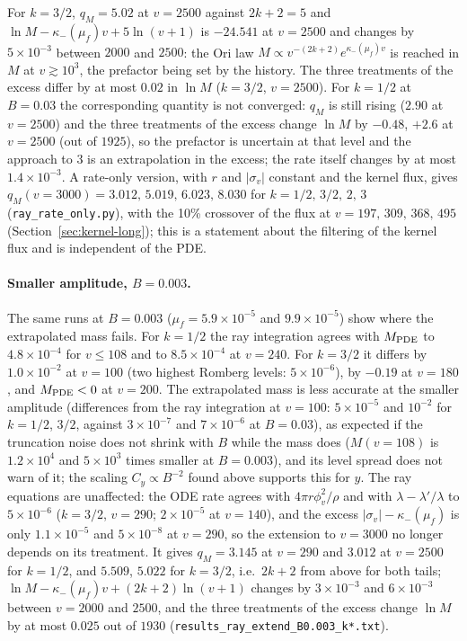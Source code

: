 \documentclass[11pt]{article}
\begin{document}
For $k=3/2$, $q_M=5.02$ at $v=2500$ against $2k+2=5$ and $\ln M-\kappa_-(\mu_f)v+5\ln(v+1)$ is $-24.541$ at $v=2500$ and changes by $5\times10^{-3}$ between $2000$ and $2500$: the Ori law $M\propto v^{-(2k+2)}e^{\kappa_-(\mu_f)v}$ is reached in $M$ at $v\gtrsim10^3$, the prefactor being set by the history. The three treatments of the excess differ by at most $0.02$ in $\ln M$ ($k=3/2$, $v=2500$). For $k=1/2$ at $B=0.03$ the corresponding quantity is not converged: $q_M$ is still rising ($2.90$ at $v=2500$) and the three treatments of the excess change $\ln M$ by $-0.48$, $+2.6$ at $v=2500$ (out of $1925$), so the prefactor is uncertain at that level and the approach to $3$ is an extrapolation in the excess; the rate itself changes by at most $1.4\times10^{-3}$. A rate-only version, with $r$ and $|\sigma_v|$ constant and the kernel flux, gives $q_M(v=3000)=3.012,\,5.019,\,6.023,\,8.030$ for $k=1/2,\,3/2,\,2,\,3$ (\texttt{ray\_rate\_only.py}), with the 10\% crossover of the flux at $v=197,\,309,\,368,\,495$ (Section~\ref{sec:kernel-long}); this is a statement about the filtering of the kernel flux and is independent of the PDE.

\paragraph{Smaller amplitude, $B=0.003$.} The same runs at $B=0.003$ ($\mu_f=5.9\times10^{-5}$ and $9.9\times10^{-5}$) show where the extrapolated mass fails. For $k=1/2$ the ray integration agrees with $M_{\rm PDE}$ to $4.8\times10^{-4}$ for $v\le108$ and to $8.5\times10^{-4}$ at $v=240$. For $k=3/2$ it differs by $1.0\times10^{-2}$ at $v=100$ (two highest Romberg levels: $5\times10^{-6}$), by $-0.19$ at $v=180$, and $M_{\rm PDE}<0$ at $v=200$. The extrapolated mass is less accurate at the smaller amplitude (differences from the ray integration at $v=100$: $5\times10^{-5}$ and $10^{-2}$ for $k=1/2$, $3/2$, against $3\times10^{-7}$ and $7\times10^{-6}$ at $B=0.03$), as expected if the truncation noise does not shrink with $B$ while the mass does ($M(v=108)$ is $1.2\times10^{4}$ and $5\times10^{3}$ times smaller at $B=0.003$), and its level spread does not warn of it; the scaling $C_y\propto B^{-2}$ found above supports this for $y$. The ray equations are unaffected: the ODE rate agrees with $4\pi r\phi_v^2/\rho$ and with $\lambda-\lambda'/\lambda$ to $5\times10^{-6}$ ($k=3/2$, $v=290$; $2\times10^{-5}$ at $v=140$), and the excess $|\sigma_v|-\kappa_-(\mu_f)$ is only $1.1\times10^{-5}$ and $5\times10^{-8}$ at $v=290$, so the extension to $v=3000$ no longer depends on its treatment. It gives $q_M=3.145$ at $v=290$ and $3.012$ at $v=2500$ for $k=1/2$, and $5.509$, $5.022$ for $k=3/2$, i.e.\ $2k+2$ from above for both tails; $\ln M-\kappa_-(\mu_f)v+(2k+2)\ln(v+1)$ changes by $3\times10^{-3}$ and $6\times10^{-3}$ between $v=2000$ and $2500$, and the three treatments of the excess change $\ln M$ by at most $0.025$ out of $1930$ (\texttt{results\_ray\_extend\_B0.003\_k*.txt}).
\end{document}
